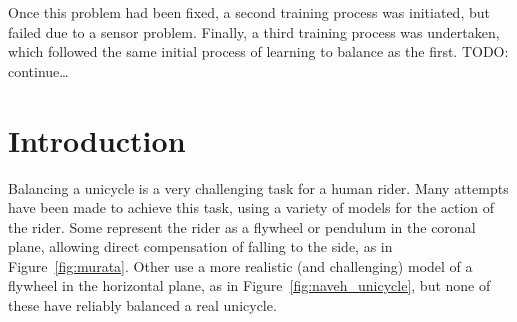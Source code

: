 \documentclass{IIBproject}
\begin{document}
Once this problem had been fixed, a second training process was initiated, but
failed due to a sensor problem. Finally, a third training process was
undertaken, which followed the same initial process of learning to balance as
the first. TODO: continue\dots

\newpage
\section{Introduction}

Balancing a unicycle is a very challenging task for a
human rider. Many attempts have been made to achieve this task, using a
variety of models for the action of the rider. Some represent the rider as a
flywheel or pendulum in the coronal plane, allowing direct compensation of
falling to the side\cite{ref:zenkov,ref:murata}, as in
Figure~\ref{fig:murata}. Other use a more realistic (and challenging) model of
a flywheel in the horizontal plane\cite{ref:vos,ref:naveh}, as in
Figure~\ref{fig:naveh_unicycle}, but none of these
have reliably balanced a real unicycle.
\end{document}
